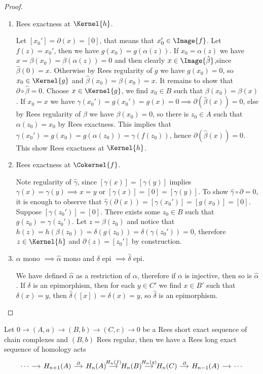 \begin{proof}[Proof]
\begin{enumerate}
        \item Rees exactness at $\Kernel{h}$.\par
        Let $[x_0']=\partial(x)=[0]$, that means that $x_0'\in\Image{f}$. Let $f(z)=x_0'$, then we have $g(x_0)=g(\alpha(z))$.
        If $x_0=\alpha(z)$ we have $x=\beta(x_0)=\beta(\alpha(z))=0$ and then clearly $x\in\Image{\hat{\beta}}$,since $\hat{\beta}(0)=x$.
        Otherwise by Rees regularity of $g$ we have $g(x_0)=0$, so $x_0\in\Kernel{g}$ and $\hat{\beta}(x_0)=\beta(x_0)=x$.
        It remains to show that $\partial\circ\hat{\beta}=0$. Choose $x\in\Kernel{g}$, we find $x_0\in B$ such that 
        $\beta(x_0)=\beta(x)$. If $x_0=x$ we have $\gamma(x_0')=g(x_0')=g(x)=0 \implies \partial(\hat{\beta}(x))=0$, else by Rees regularity
        of $\beta$ we have $\beta(x_0)=0$, so there is $z_0\in A$ such that $\alpha(z_0)=x_0$ by Rees exactness. This implies that 
        $\gamma(x_0')=g(x_0)=g(\alpha(z_0))=\gamma(f(z_0))$, hence $\partial(\hat{\beta}(x))=0$. This show Rees exactness at $\Kernel{h}$. 
        \item Rees exactness at $\Cokernel{f}$.\par 
        Note regularity of $\hat{\gamma}$, since $[\gamma(x)]=[\gamma(y)]$ implies $\gamma(x)=\gamma(y)\implies x=y$ or 
        $[\gamma(x)]=[0]=[\gamma(y)]$. To show $\hat{\gamma}\circ\partial = 0$, it is enough to observe that 
        $\hat{\gamma}(\partial(x))=[\gamma(x_0')]=[g(x_0)]=[0]$. Suppose $[\gamma(z_0')]=[0]$. There exists some 
        $z_0\in B$ such that $g(z_0)=\gamma(z_0')$. Let $z = \beta(z_0)$ and notice that 
        $h(z) = h(\beta(z_0))= \delta(g(z_0))=\delta(\gamma(z_0'))=0$, therefore $z\in\Kernel{h}$ and $\partial(z)=[z_0']$ by
        construction.
        \item $\alpha$ mono $\implies\hat{\alpha}$ mono and $\delta$ epi $\implies\hat{\delta}$ epi.\par 
        We have defined $\hat{\alpha}$ as a restriction of $\alpha$, therefore if $\alpha$ is injective, then so is $\hat{\alpha}$. 
        If $\delta$ is an epimorphism, then for each $y\in C'$ we find $x\in B'$ such that $\delta(x)=y$, then
        $\hat{\delta}([x]) = \delta(x) = y$, so $\hat{\delta}$ is an epimorphism.
        
    \end{enumerate}
\end{proof}
\begin{corollary}
    Let $0 \to (A,a) \to (B,b) \to (C,c) \to 0$ be a Rees short exact sequence of chain complexes and $(B,b)$ Rees regular, then 
    we have a Rees long exact sequence of homology acts 
    \[\begin{tikzcd}[sep=small]
        \cdots & {H_{n+1}(A)} & {H_n(A)} & {H_n(B)} & {H_n(C)} & {H_{n-1}(A)} & \cdots
        \arrow[from=1-1, to=1-2]
        \arrow["\partial", from=1-2, to=1-3]
        \arrow["{H_n(f)}", from=1-3, to=1-4]
        \arrow["{H_n(g)}", from=1-4, to=1-5]
        \arrow["\partial", from=1-5, to=1-6]
        \arrow[from=1-6, to=1-7]
    \end{tikzcd}\]
\end{corollary}
